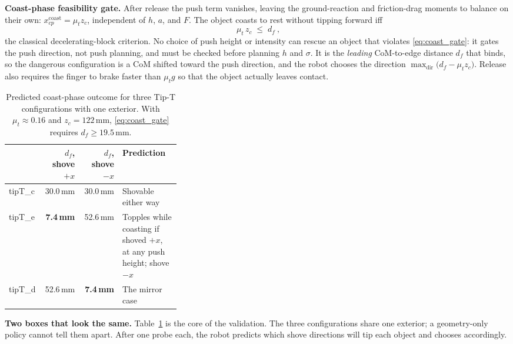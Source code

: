 \documentclass[10pt, conference]{IEEEtran}
\begin{document}
\noindent \textbf{Coast-phase feasibility gate.} After release the push term vanishes, leaving the ground-reaction and friction-drag moments to balance on their own: $x_{cp}^{\mathrm{coast}} = \mu_t z_c$, independent of $h$, $a$, and $F$. The object coasts to rest without tipping forward iff
\begin{equation}
    \boxed{\ \mu_t\, z_c \;\le\; d_f\ },
    \label{eq:coast_gate}
\end{equation}
the classical decelerating-block criterion. No choice of push height or intensity can rescue an object that violates \eqref{eq:coast_gate}: it gates the push direction, not push planning, and must be checked before planning $h$ and $\sigma$. It is the \emph{leading} CoM-to-edge distance $d_f$ that binds, so the dangerous configuration is a CoM shifted toward the push direction, and the robot chooses the direction $\max_{\text{dir}}\big(d_f - \mu_t z_c\big)$. Release also requires the finger to brake faster than $\mu_t g$ so that the object actually leaves contact.

\begin{table}[t]
  \centering
  \caption{Predicted coast-phase outcome for three Tip-T configurations with one exterior. With $\mu_t \approx 0.16$ and $z_c = 122$\,mm, \eqref{eq:coast_gate} requires $d_f \ge 19.5$\,mm.}
  \label{tab:coast_pred}
  \small
  \begin{tabular}{l r r p{0.34\linewidth}}
    \toprule
    & $d_f$, shove $+x$ & $d_f$, shove $-x$ & \textbf{Prediction} \\
    \midrule
    tipT\_c & 30.0\,mm & 30.0\,mm & Shovable either way \\
    tipT\_e & \textbf{7.4\,mm} & 52.6\,mm & Topples while coasting if shoved $+x$, at any push height; shove $-x$ \\
    tipT\_d & 52.6\,mm & \textbf{7.4\,mm} & The mirror case \\
    \bottomrule
  \end{tabular}
\end{table}

\noindent \textbf{Two boxes that look the same.} Table~\ref{tab:coast_pred} is the core of the validation. The three configurations share one exterior; a geometry-only policy cannot tell them apart. After one probe each, the robot predicts which shove directions will tip each object and chooses accordingly.
\end{document}

